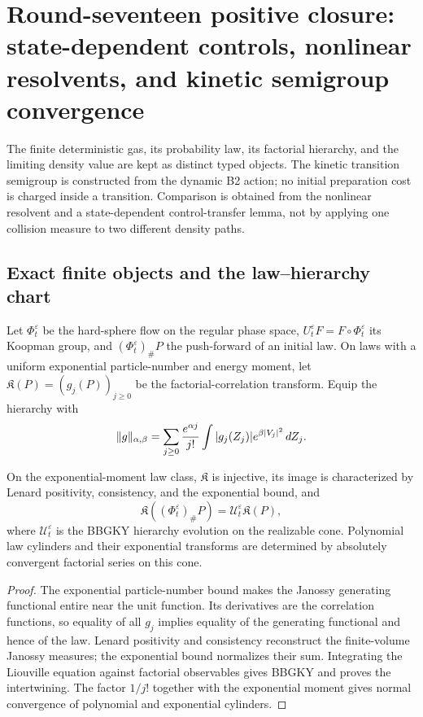 \section{Round-seventeen positive closure: state-dependent controls, nonlinear resolvents, and kinetic semigroup convergence}
\label{sec:r17-b4}

The finite deterministic gas, its probability law, its factorial hierarchy,
and the limiting density value are kept as distinct typed objects.  The
kinetic transition semigroup is constructed from the dynamic B2 action; no
initial preparation cost is charged inside a transition.  Comparison is
obtained from the nonlinear resolvent and a state-dependent control-transfer
lemma, not by applying one collision measure to two different density paths.

\subsection{Exact finite objects and the law--hierarchy chart}

Let $\Phi_t^\varepsilon$ be the hard-sphere flow on the regular phase space,
$U_t^\varepsilon F=F\circ\Phi_t^\varepsilon$ its Koopman group, and
$(\Phi_t^\varepsilon)_\#P$ the push-forward of an initial law.  On laws with a
uniform exponential particle-number and energy moment, let
$\mathfrak K(P)=(g_j(P))_{j\ge0}$ be the factorial-correlation transform.
Equip the hierarchy with
\[
 \|g\|_{\alpha,\beta}=
 \sum_{j\ge0}{e^{\alpha j}\over j!}
 \int |g_j(Z_j)|e^{\beta|V_j|^2}\,dZ_j.
\]

\begin{theorem}
\label{thm:r17-b4-intertwiner}
On the exponential-moment law class, $\mathfrak K$ is injective, its image is
characterized by Lenard positivity, consistency, and the exponential bound,
and
\[
 \mathfrak K((\Phi_t^\varepsilon)_\#P)
 =\mathscr U_t^\varepsilon\mathfrak K(P),
\]
where $\mathscr U_t^\varepsilon$ is the BBGKY hierarchy evolution on the
realizable cone.  Polynomial law cylinders and their exponential transforms
are determined by absolutely convergent factorial series on this cone.
\end{theorem}

\begin{proof}
The exponential particle-number bound makes the Janossy generating functional
entire near the unit function.  Its derivatives are the correlation
functions, so equality of all $g_j$ implies equality of the generating
functional and hence of the law.  Lenard positivity and consistency reconstruct
the finite-volume Janossy measures; the exponential bound normalizes their
sum.  Integrating the Liouville equation against factorial observables gives
BBGKY and proves the intertwining.  The factor $1/j!$ together with the
exponential moment gives normal convergence of polynomial and exponential
cylinders.
\end{proof}

